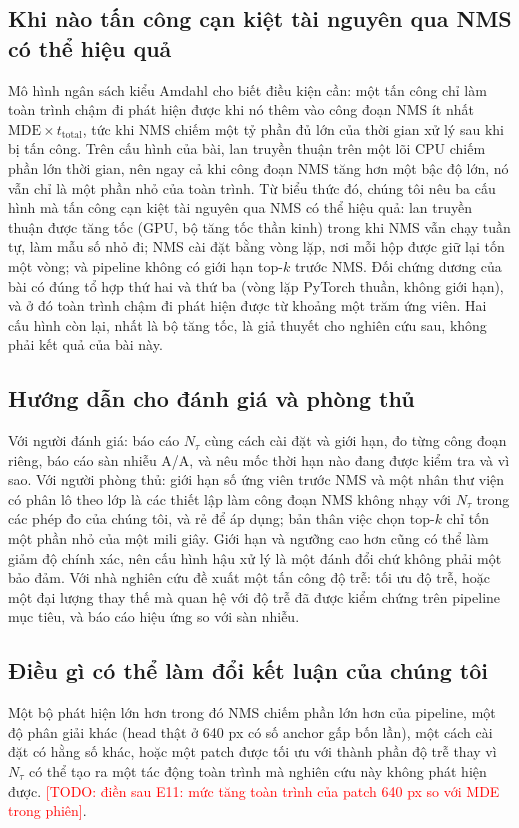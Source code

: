 \documentclass[a4paper,fleqn]{cas-dc}
\newcommand{\todo}[1]{\textcolor{red}{[TODO: #1]}}
\newcommand{\Ntau}{N_{\tau}}
\begin{document}
\subsection{Khi nào tấn công cạn kiệt tài nguyên qua NMS có thể hiệu quả}
Mô hình ngân sách kiểu Amdahl cho biết điều kiện cần: một tấn công chỉ làm toàn trình chậm đi phát hiện được khi nó thêm vào công đoạn NMS ít nhất $\mathrm{MDE}\times t_{\mathrm{total}}$, tức khi NMS chiếm một tỷ phần đủ lớn của thời gian xử lý sau khi bị tấn công. Trên cấu hình của bài, lan truyền thuận trên một lõi CPU chiếm phần lớn thời gian, nên ngay cả khi công đoạn NMS tăng hơn một bậc độ lớn, nó vẫn chỉ là một phần nhỏ của toàn trình. Từ biểu thức đó, chúng tôi nêu ba cấu hình mà tấn công cạn kiệt tài nguyên qua NMS có thể hiệu quả: lan truyền thuận được tăng tốc (GPU, bộ tăng tốc thần kinh) trong khi NMS vẫn chạy tuần tự, làm mẫu số nhỏ đi; NMS cài đặt bằng vòng lặp, nơi mỗi hộp được giữ lại tốn một vòng; và pipeline không có giới hạn top-$k$ trước NMS. Đối chứng dương của bài có đúng tổ hợp thứ hai và thứ ba (vòng lặp PyTorch thuần, không giới hạn), và ở đó toàn trình chậm đi phát hiện được từ khoảng một trăm ứng viên. Hai cấu hình còn lại, nhất là bộ tăng tốc, là giả thuyết cho nghiên cứu sau, không phải kết quả của bài này.

\subsection{Hướng dẫn cho đánh giá và phòng thủ}
Với người đánh giá: báo cáo $\Ntau$ cùng cách cài đặt và giới hạn, đo từng công đoạn riêng, báo cáo sàn nhiễu A/A, và nêu mốc thời hạn nào đang được kiểm tra và vì sao. Với người phòng thủ: giới hạn số ứng viên trước NMS và một nhân thư viện có phân lô theo lớp là các thiết lập làm công đoạn NMS không nhạy với $\Ntau$ trong các phép đo của chúng tôi, và rẻ để áp dụng; bản thân việc chọn top-$k$ chỉ tốn một phần nhỏ của một mili giây. Giới hạn và ngưỡng cao hơn cũng có thể làm giảm độ chính xác, nên cấu hình hậu xử lý là một đánh đổi chứ không phải một bảo đảm. Với nhà nghiên cứu đề xuất một tấn công độ trễ: tối ưu độ trễ, hoặc một đại lượng thay thế mà quan hệ với độ trễ đã được kiểm chứng trên pipeline mục tiêu, và báo cáo hiệu ứng so với sàn nhiễu.

\subsection{Điều gì có thể làm đổi kết luận của chúng tôi}
Một bộ phát hiện lớn hơn trong đó NMS chiếm phần lớn hơn của pipeline, một độ phân giải khác (head thật ở 640 px có số anchor gấp bốn lần), một cách cài đặt có hằng số khác, hoặc một patch được tối ưu với thành phần độ trễ thay vì $\Ntau$ có thể tạo ra một tác động toàn trình mà nghiên cứu này không phát hiện được. \todo{điền sau E11: mức tăng toàn trình của patch 640 px so với MDE trong phiên}.
\end{document}

